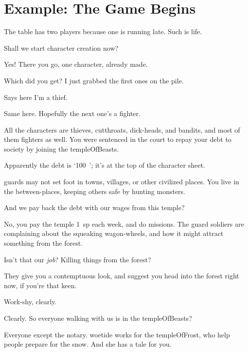 \section{Example: The Game Begins}

\begin{multicols}{3}

\noindent
The table has two players because one is running late.
Such is life.


\begin{description}\sf
  \item[Player 1:]
  Shall we start character creation now?
  \item[\Glsentrytext{gm}:]
  Yes!
  There you go, one character, already made.

  Which did you get?
  I just grabbed the first ones on the pile.
  \item[Player 2:]
  Says here I'm a thief.
  \item[Player 1:]
  Same here.
  Hopefully the next one's a fighter.
  \item[\Glsentrytext{gm}:]
  All the characters are thieves, cutthroats, dick-heads, and bandits, and most of them fighters as well.
  You were sentenced in the \gls{court} to repay your debt to society by joining the \gls{templeOfBeasts}.
  \item[Player 1:]
  Apparently the debt is `100~'; it's at the top of the character sheet.
  \item[\Gls{gm}:]
  \Glspl{guard} may not set foot in towns, \glspl{village}, or other civilized places.
  You live in the between-places, keeping others safe by hunting \glspl{monster}.
  \item[Player 1:]
  And we pay back the debt with our wages from this \gls{temple}?
  \item[\Gls{gm}:]
  No, you pay the \gls{temple} 1~\gls{sp} each week, and do missions.
  The \gls{guard} \glspl{soldier} are complaining about the squeaking wagon-wheels, and how it might attract something from the forest.
  \item[Player 2:]
  Isn't that our \emph{job}?
  Killing things from the forest?
  \item[\Gls{gm}:]
  They give you a contemptuous look, and suggest you head into the forest right now, if you're that keen.
  \item[Player 2:]
  Work-shy, clearly.
  \item[Player 1:]
  Clearly.
  So everyone walking with us is in the \gls{templeOfBeasts}?
  \item[\Gls{gm}:]
  Everyone except the \gls{notary}.
  \Gls{woetide} works for the \gls{templeOfFrost}, who help people prepare for the snow.
  And she has a tale for you.


\end{description}
\end{multicols}
